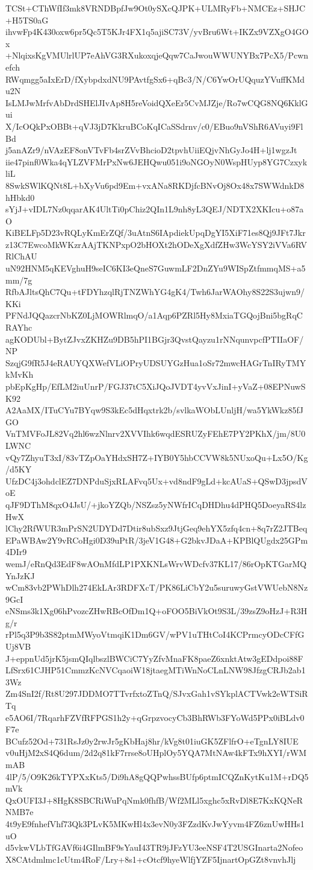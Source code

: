 TCSt+CThWfIf3mk8VRNDBpfJw9Ot0ySXcQJPK+ULMRyFb+NMCEz+SHJC+H5TS0aG
ihvwFp4K430oxw6pr5Qc5T5KJr4FX1q5ajiSC73V/yvBru6Wt+IKZx9VZXgO4GOx
+NlqixsKgVMUlrlUP7eAhVG3RXukoxqjeQqw7CaJwouWWUNYBx7PcX5/Pcwnefch
RWqmgg5aIxErD/fXybpdxdNU9PAvtfgSx6+qBc3/N/C6YwOrUQquzYVuffKMdu2N
IsLMJwMrfvAbDrdSHElJIvAp8H5reVoidQXeEr5CvMJZje/Ro7wCQG8NQ6KklGui
X/IcOQkPxOBBt+qVJ3jD7KkruBCoKqICaSSdrnv/c0/EBuo9nVShR6AVuyi9FlBd
j5anAZr9/nVAzEF8onVTvFb4srZVvBhcioD2tpvhUiiEQjvNhGyJo4H+lj1wgzJt
iie47pinf0Wka4qYLZVFMrPxNw6JEHQwu051i9oNGOyN0WspHUyp8YG7CzxykliL
8SwkSWlKQNt8L+bXyVu6pd9Em+vxANa8RKDjfcBNvOj8Ox48x7SWWdnkD8hHbkd0
sYjJ+vIDL7Nz0qqarAK4UltTi0pChiz2QIn1L9nh8yL3QEJ/NDTX2XKIcu+o87aO
KiBELFp5D23vRQLyKmErZQf/3uAtnS6IApdiekUpqDgYI5XiF71es8Qj9JFt7Jkr
z13C7EwcoMkWKzrAAjTKNPxpO2bHOXt2hODeXgXdfZHw3WcYSY2iVVa6RVRlChAU
uN92HNM5qKEVghuH9seIC6KI3eQneS7GuwmLF2DnZYu9WISpZtfmmqMS+a5mm/7g
RfbAJltsQhC7Qu+tFDYhzqlRjTNZWhYG4gK4/Twh6JarWAOhy8S22S3ujwn9/KKi
PFNdJQQazcrNbKZ0LjMOWRlmqO/a1Aqp6PZRl5Hy8MxiaTGQojBni5bgRqCRAYhc
agKODUbl+BytZJvxZKHZu9DB5hPI1BGjr3QvstQayzu1rNNqunvpcfPTIIaOF/NP
SzqjG9fR5J4eRAUYQXWefVLiOPryUDSUYGzHua1oSr72mwcHAGrTnIRyTMYkMvKh
pbEpKgHp/EfLM2iuUnrP/FGJ37tC5XiJQoJVDT4yvVxJinI+yVaZ+08EPNuwSK92
A2AaMX/ITuCYu7BYqw9S3kEc5dHqxtrk2b/svlkaWObLUnljH/wa5YkWkz85fJGO
VnTMVFoJL82Vq2hl6wzNlnrv2XVVIhk6wqdESRUZyFEhE7PY2PKhX/jm/8U0LWNC
vQy7ZhyuT3xI/83vTZpOaYHdxSH7Z+IYB0Y5hbCCVW8k5NUxoQu+Lx5O/Kg/d5KY
UfzDC4j3ohdclEZ7DNPduSjxRLAFvq5Ux+vd8ndF9gLd+kcAUaS+QSwD3jpsdVoE
qJF9DThM8qxO4JsU/+jkoYZQb/NSZsz5yNWfrICqDHDhu4dPHQ5DoeyaRS4lzHwX
lChy2RfWUR3mPrSN2UDYDd7Dtir8ubSxz9JtjGeq9ehYX5zfq4cn+8q7rZ2JTBeq
EPaWBAw2Y9vRCoHgi0D39uPtR/3jeV1G48+G2bkvJDaA+KPBlQUgdx25GPm4DIr9
wemJ/eRnQd3EdF8wAOnMfdLP1PXKNLsWrvWDcfv37KL17/86rOpKTGarMQYnJzKJ
wCm83vb2PWhDlh274EkLAr3RDFXcT/PK86LiCbY2u5suruwyGstVWUebN8Nz9GcI
eNSms3k1Xg06hPvozcZHwRBcOfDm1Q+oFOO5BiVkOt9S3L/39zsZ9oHzJ+R3Hg/r
rPl5q3P9b3S82ptmMWyoVtmqiK1Dm6GV/wPV1uTHtCoI4KCPrmcyODcCFfGUj8VB
J+eppnUd5jrK5jsmQIqlbszlBWCiC7YyZfvMnaFK8paeZ6xnktAtw3gEDdpoi88F
LfSrx61CJHP51CmmzKcNVCqaoiW18jtaegMTiWnNoCLnLNW98JfzgCRJb2ab13Wz
Zm4SnI2f/Rt8U297JDDMO7TTvrfxtoZTnQ/SJvxGah1vSYkplACTVwk2eWTSiRTq
e5AO6I/7RqarhFZVfRFPGS1h2y+qGrpzvocyCb3BhRWb3FYoWd5PPx0iBLdv0F7e
BCufz52Od+731RsJz0y2rwJr5gKbHaj8hr/kVg8t01iuGK5ZFlfrO+eTgnLY8IUE
v0uHjM2xS4Q6dum/2d2q81kF7rrse8oUHplOy5YQA7MtNAw4kFTx9hXYI/rWMmAB
4lP/5/O9K26kTYPXxKts5/Di9hA8gQQPwhssBUfp6ptmICQZnKytKu1M+rDQ5mVk
QxOUFI3J+8HgK8SBCRiWuPqNmk0fhfB/Wf2MLl5xghc5xRvDl8E7KxKQNeRNMB7e
4t9yE9fnhefVhf73Qk3PLvK5MKwHl4x3evN0y3FZzdKvJwYyvm4FZ6znUwHHs1uO
d5vkwVLbTfGAVf6i4GIlmBF9sYauI43TR9jJFzYU3eeNSF4T2USGInarta2Nofeo
X8CAtdmlmc1cUtm4RoF/Lry+8s1+cOtcf9hyeWlfjYZF5IjnartOpGZt8vnvhJlj
